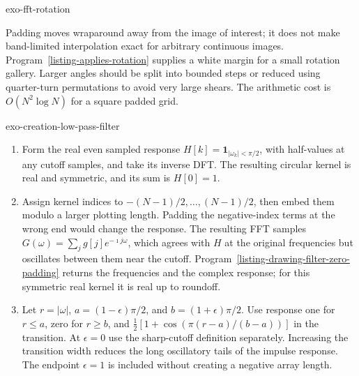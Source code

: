 \begin{correction}{exo-fft-rotation}
\begin{enumerate}
Padding moves wraparound away from the image of interest; it does not make
band-limited interpolation exact for arbitrary continuous images.
Program~\ref{listing-applies-rotation} supplies a white margin for a small
rotation gallery. Larger angles should be split into bounded steps or
reduced using quarter-turn permutations to avoid very large shears.
The arithmetic cost is $O(N^2\log N)$ for a square padded grid.
\begin{listing}[H]
\caption{A rotation gallery with a padded white margin.}
\label{listing-applies-rotation}
\end{listing}
\end{enumerate}
\end{correction}

\begin{correction}{exo-creation-low-pass-filter}
\begin{enumerate}
\item Form the real even sampled response $H[k]=\mathbf1_{|\omega_k|<\pi/2}$,
with half-values at any cutoff samples, and take its inverse DFT.
The resulting circular kernel is real and symmetric, and its sum is $H[0]=1$.
\begin{listing}[H]
\caption{A sharp sampled low-pass response and its inverse transform.}
\label{listing-low-pass-filter}
\end{listing}
\item Assign kernel indices to $-(N-1)/2,\ldots,(N-1)/2$, then embed them
modulo a larger plotting length. Padding the negative-index terms at the
wrong end would change the response. The resulting FFT samples
$G(\omega)=\sum_jg[j]e^{-\imath j\omega}$, which agrees with $H$ at the
original frequencies but oscillates between them near the cutoff.
Program~\ref{listing-drawing-filter-zero-padding} returns the frequencies
and the complex response; for this symmetric real kernel it is real up to roundoff.
\begin{listing}[H]
\caption{Dense frequency-response evaluation with centered kernel indices.}
\label{listing-drawing-filter-zero-padding}
\end{listing}
\item Let $r=|\omega|$, $a=(1-\epsilon)\pi/2$, and
$b=(1+\epsilon)\pi/2$. Use response one for $r\leq a$, zero for $r\geq b$,
and $\tfrac12[1+\cos(\pi(r-a)/(b-a))]$ in the transition.
At $\epsilon=0$ use the sharp-cutoff definition separately.
Increasing the transition width reduces the long oscillatory tails of the
impulse response. The endpoint $\epsilon=1$ is included without creating
a negative array length.
\begin{listing}[H]
\caption{A raised-cosine transition, including both endpoint parameters.}
\label{configurable-filter-listing}
\end{listing}
\end{enumerate}
\end{correction}

